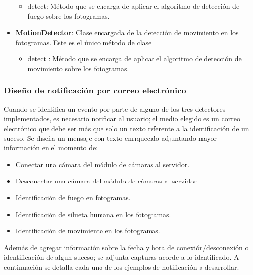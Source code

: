 \begin{itemize}
\begin{itemize}
            \item detect: Método que se encarga de aplicar el algoritmo de detección de fuego sobre los fotogramas.
        \end{itemize}
    \item \textbf{MotionDetector}: Clase encargada de la detección de movimiento en los fotogramas. Este es el único método de clase:
        \begin{itemize}
            \item detect : Método que se encarga de aplicar el algoritmo de detección de movimiento sobre los fotogramas.
        \end{itemize}
\end{itemize}

\subsubsection{Diseño de notificación por correo electrónico}
Cuando se identifica un evento por parte de alguno de los tres detectores implementados, es necesario notificar al usuario; el medio elegido es un correo electrónico que debe ser más que solo un texto referente a la identificación de un suceso. Se diseña un mensaje con texto enriquecido adjuntando mayor información en el momento de:
\begin{itemize}
    \item Conectar una cámara del módulo de cámaras al servidor.
    \item Desconectar una cámara del módulo de cámaras al servidor.
    \item Identificación de fuego en fotogramas.
    \item Identificación de silueta humana en los fotogramas.
    \item Identificación de movimiento en los fotogramas.
\end{itemize}
Además de agregar información sobre la fecha y hora de conexión/desconexión o identificación de algun suceso; se adjunta capturas acorde a lo identificado. A continuación se detalla cada uno de los ejemplos de notificación a desarrollar.

